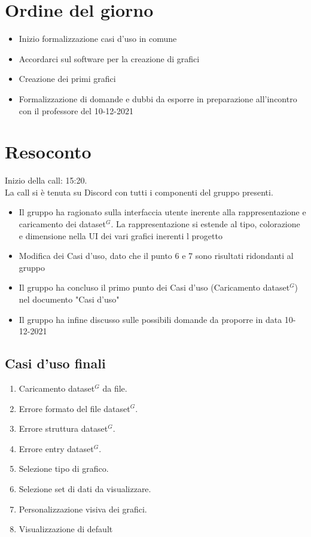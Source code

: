 \section{Ordine del giorno}

\begin{itemize}
	\item Inizio formalizzazione casi d'uso in comune
	\item Accordarci sul software per la creazione di grafici
	\item Creazione dei primi grafici
	\item Formalizzazione di domande e dubbi da esporre in preparazione all'incontro con il professore del 10-12-2021
\end{itemize}

\section{Resoconto}

\noindent 
Inizio della call: 15:20. \\
\noindent La call si è tenuta su Discord con tutti i componenti del gruppo presenti.
\begin{itemize}
	\item Il gruppo ha ragionato sulla interfaccia utente inerente alla rappresentazione e caricamento dei dataset$^{G}$. La rappresentazione si estende al tipo, colorazione e dimensione nella UI dei vari grafici inerenti l progetto
	\item Modifica dei Casi d'uso, dato che il punto 6 e 7 sono risultati ridondanti al gruppo
	\item Il gruppo ha concluso il primo punto dei Casi d'uso (Caricamento dataset$^{G}$) nel documento "Casi d'uso"
	\item Il gruppo ha infine discusso sulle possibili domande da proporre in data 10-12-2021
\end{itemize}

\subsection{Casi d'uso finali}
\begin{enumerate}
	\item Caricamento dataset$^{G}$ da file.
	\item Errore formato del file dataset$^{G}$.
	\item Errore struttura dataset$^{G}$.
	\item Errore entry dataset$^{G}$.
	\item Selezione tipo di grafico.
	\item Selezione set di dati da visualizzare.
	\item Personalizzazione visiva dei grafici.
	\item Visualizzazione di default
\end{enumerate}

